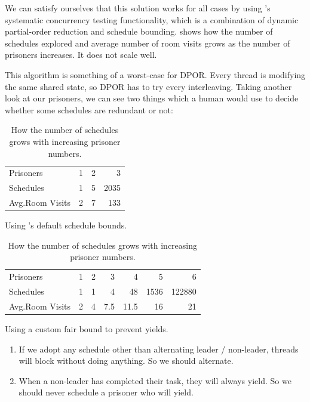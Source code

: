 We can satisfy ourselves that this solution works for all cases by
using \dejafu{}'s systematic concurrency testing functionality, which
is a combination of dynamic partial-order reduction and schedule
bounding.   shows how the number of schedules
explored and average number of room visits grows as the number of
prisoners increases.  It does not scale well.

This algorithm is something of a worst-case for DPOR.  Every thread is
modifying the same shared state, so DPOR has to try every
interleaving.  Taking another look at our prisoners, we can see two
things which a human would use to decide whether some schedules are
redundant or not:

\begin{table}
\begin{subtable}{\textwidth}
  \centering
  \begin{tabular}{lrrr} \toprule
    Prisoners          & 1 & 2 &    3 \\
    Schedules          & 1 & 5 & 2035 \\
    Avg.\@ Room Visits & 2 & 7 &  133 \\ \bottomrule
  \end{tabular}
  \caption{Using \dejafu{}'s default schedule bounds.}\label{tbl:100slow}
\end{subtable}

\vspace{2.5em}

\begin{subtable}{\textwidth}
  \centering
  \begin{tabular}{lrrrrrr} \toprule
    Prisoners          & 1 & 2 & 3   &  4   &    5 &      6 \\
    Schedules          & 1 & 1 & 4   & 48   & 1536 & 122880 \\
    Avg.\@ Room Visits & 2 & 4 & 7.5 & 11.5 &   16 &     21 \\ \bottomrule
  \end{tabular}
  \caption{Using a custom fair bound to prevent yields.}\label{tbl:100fast}
\end{subtable}
\caption{How the number of schedules grows with increasing prisoner numbers.}\label{tbl:100slowfast}
\end{table}

\begin{enumerate}
\item If we adopt any schedule other than alternating leader /
  non-leader, threads will block without doing anything.  So we should
  alternate.
\item When a non-leader has completed their task, they will always
  yield.  So we should never schedule a prisoner who will yield.
\end{enumerate}

